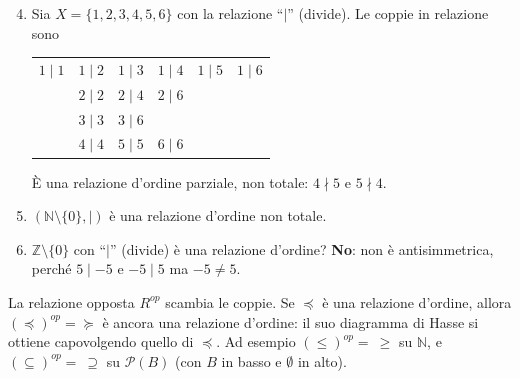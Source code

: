 \documentclass[11pt,a4paper]{article}
\begin{document}
\begin{esempio}[continua]
\leavevmode
\begin{enumerate}
    \setcounter{enumi}{3}
    \item Sia $X = \{1, 2, 3, 4, 5, 6\}$ con la relazione ``$\mid$''
          (divide). Le coppie in relazione sono
          \begin{center}
          \begin{tabular}{llllll}
          $1 \mid 1$ & $1 \mid 2$ & $1 \mid 3$ & $1 \mid 4$ & $1 \mid 5$ &
          $1 \mid 6$ \\
                     & $2 \mid 2$ & $2 \mid 4$ & $2 \mid 6$ \\
                     & $3 \mid 3$ & $3 \mid 6$ \\
                     & $4 \mid 4$ & $5 \mid 5$ & $6 \mid 6$
          \end{tabular}
          \end{center}
          È una relazione d'ordine parziale, non totale: $4 \nmid 5$ e
          $5 \nmid 4$.

\begin{center}
\end{center}

    \item $(\mathbb{N} \setminus \{0\}, \mid)$ è una relazione d'ordine non
          totale.

    \item $\mathbb{Z} \setminus \{0\}$ con ``$\mid$'' (divide) è una
          relazione d'ordine? \textbf{No}: non è antisimmetrica, perché
          $5 \mid -5$ e $-5 \mid 5$ ma $-5 \neq 5$.
\end{enumerate}
\end{esempio}

\begin{osservazione}
La relazione opposta $R^{op}$ scambia le coppie. Se $\preceq$ è una
relazione d'ordine, allora $(\preceq)^{op} = \succeq$ è ancora una relazione
d'ordine: il suo diagramma di Hasse si ottiene capovolgendo quello di
$\preceq$. Ad esempio $(\leq)^{op} = \ \geq$ su $\mathbb{N}$, e
$(\subseteq)^{op} = \ \supseteq$ su $\mathcal{P}(B)$ (con $B$ in basso e
$\emptyset$ in alto).
\end{osservazione}
\end{document}
